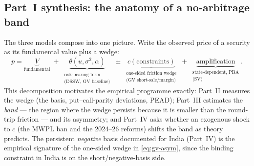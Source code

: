 \subsection{Part~I synthesis: the anatomy of a no-arbitrage band}
The three models compose into one picture. Write the observed price of a security as its fundamental value plus a wedge:
\begin{equation}
p = \underbrace{V}_{\text{fundamental}} \;+\; \underbrace{\theta(u,\sigma^2,\alpha)}_{\substack{\text{risk-bearing term}\\ \text{(DSSW, GV baseline)}}} \;\pm\; \underbrace{c(\text{constraints})}_{\substack{\text{one-sided friction wedge}\\ \text{(GV short-sale/margin)}}} \;+\; \underbrace{\text{amplification}}_{\substack{\text{state-dependent, PBA}\\ \text{(SV)}}}.
\end{equation}
This decomposition motivates the empirical programme exactly: Part~II measures the wedge (the basis, put--call-parity deviations, PEAD); Part~III estimates the \emph{band} --- the region where the wedge persists because it is smaller than the round-trip friction --- and its asymmetry; and Part~IV asks whether an exogenous shock to $c$ (the MWPL ban and the 2024--26 reforms) shifts the band as theory predicts. The persistent \emph{negative} basis documented for India (Part~IV) is the empirical signature of the one-sided wedge in \eqref{eq:gv-asym}, since the binding constraint in India is on the short/negative-basis side.

